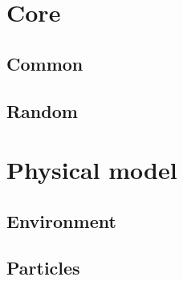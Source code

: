 \documentclass[a4paper, 12pt]{article}
\def\buildMode{buildmissing}
\begin{document}
    \begin{landscape}
    \section{Core}

        \subsection{Common}
        \begin{figure}[htb]
            \centering
            
            \caption{}
        \end{figure}

        \subsection{Random}
        \begin{figure}[htb]
            \centering
            
            \caption{}
        \end{figure}
        \clearpage

    \section{Physical model}

        \subsection{Environment}

        \begin{figure}[htb]
            \centering
            
            \caption{}
        \end{figure}
        \clearpage

        \subsection{Particles}

        \begin{figure}[htb]
            \centering
            
            \caption{}
        \end{figure}
        \clearpage


\end{landscape}
\end{document}
